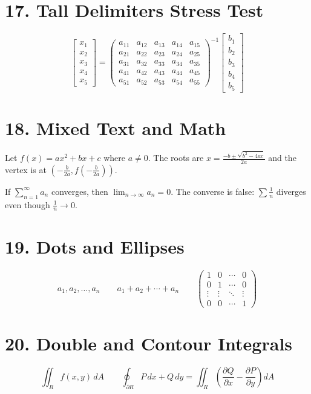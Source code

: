 \documentclass{article}
\begin{document}
\section*{17. Tall Delimiters Stress Test}

\[
\left[\begin{array}{c} x_1 \\ x_2 \\ x_3 \\ x_4 \\ x_5 \end{array}\right]
= \left(\begin{array}{ccccc}
a_{11} & a_{12} & a_{13} & a_{14} & a_{15} \\
a_{21} & a_{22} & a_{23} & a_{24} & a_{25} \\
a_{31} & a_{32} & a_{33} & a_{34} & a_{35} \\
a_{41} & a_{42} & a_{43} & a_{44} & a_{45} \\
a_{51} & a_{52} & a_{53} & a_{54} & a_{55}
\end{array}\right)^{-1}
\left[\begin{array}{c} b_1 \\ b_2 \\ b_3 \\ b_4 \\ b_5 \end{array}\right]
\]

\section*{18. Mixed Text and Math}

Let $f(x) = ax^2 + bx + c$ where $a \neq 0$. The roots are $x = \frac{-b \pm \sqrt{b^2 - 4ac}}{2a}$ and the vertex is at $\left(-\frac{b}{2a}, f\left(-\frac{b}{2a}\right)\right)$.

If $\sum_{n=1}^{\infty} a_n$ converges, then $\lim_{n \to \infty} a_n = 0$. The converse is false: $\sum \frac{1}{n}$ diverges even though $\frac{1}{n} \to 0$.

\section*{19. Dots and Ellipses}

\[ a_1, a_2, \ldots, a_n \qquad a_1 + a_2 + \cdots + a_n \qquad \begin{pmatrix} 1 & 0 & \cdots & 0 \\ 0 & 1 & \cdots & 0 \\ \vdots & \vdots & \ddots & \vdots \\ 0 & 0 & \cdots & 1 \end{pmatrix} \]

\section*{20. Double and Contour Integrals}

\[ \iint_R f(x,y) \, dA \qquad \oint_{\partial R} P\,dx + Q\,dy = \iint_R \left(\frac{\partial Q}{\partial x} - \frac{\partial P}{\partial y}\right) dA \]
\end{document}
